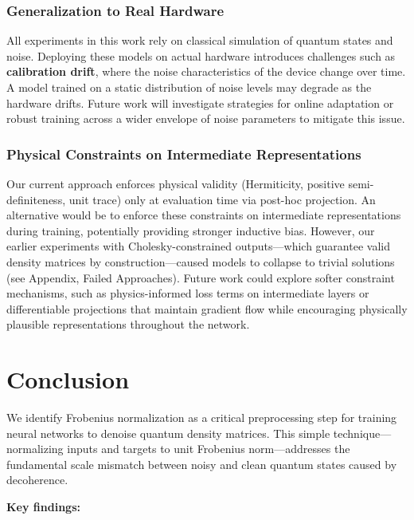 \documentclass[11pt]{article}
\begin{document}
\subsubsection{Generalization to Real Hardware}
\label{sec:org8261259}

All experiments in this work rely on classical simulation of quantum states and noise. Deploying these models on actual hardware introduces challenges such as \textbf{calibration drift}, where the noise characteristics of the device change over time. A model trained on a static distribution of noise levels may degrade as the hardware drifts. Future work will investigate strategies for online adaptation or robust training across a wider envelope of noise parameters to mitigate this issue.

\subsubsection{Physical Constraints on Intermediate Representations}
\label{sec:org2ba5eb7}

Our current approach enforces physical validity (Hermiticity, positive semi-definiteness, unit trace) only at evaluation time via post-hoc projection. An alternative would be to enforce these constraints on intermediate representations during training, potentially providing stronger inductive bias. However, our earlier experiments with Cholesky-constrained outputs---which guarantee valid density matrices by construction---caused models to collapse to trivial solutions (see Appendix, Failed Approaches). Future work could explore softer constraint mechanisms, such as physics-informed loss terms on intermediate layers or differentiable projections that maintain gradient flow while encouraging physically plausible representations throughout the network.

\section{Conclusion}
\label{sec:org26f4e3f}

We identify Frobenius normalization as a critical preprocessing step for training neural networks to denoise quantum density matrices. This simple technique---normalizing inputs and targets to unit Frobenius norm---addresses the fundamental scale mismatch between noisy and clean quantum states caused by decoherence.

\textbf{Key findings:}
\end{document}
